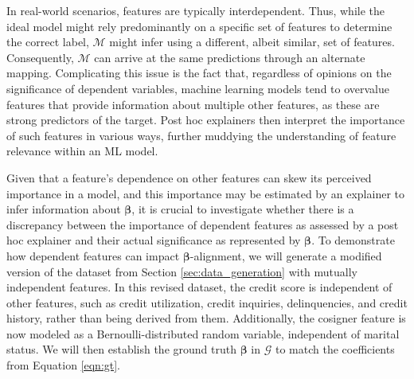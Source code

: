 \documentclass[mnsc,blindrev]{informs3}
\begin{document}
In real-world scenarios, features are typically interdependent. Thus, while the ideal model might rely predominantly on a specific set of features to determine the correct label, 
$\mathcal{M}$ might infer using a different, albeit similar, set of features. Consequently, 
$\mathcal{M}$ can arrive at the same predictions through an alternate mapping.
Complicating this issue is the fact that, regardless of opinions on the significance of dependent variables, machine learning models tend to overvalue features that provide information about multiple other features, as these are strong predictors of the target. Post hoc explainers then interpret the importance of such features in various ways, further muddying the understanding of feature relevance within an ML model.



Given that a feature's dependence on other features can skew its perceived importance in a model, and this importance may be estimated by an explainer to infer information about $\boldsymbol{\beta}$, it is crucial to investigate whether there is a discrepancy between the importance of dependent features as assessed by a post hoc explainer and their actual significance as represented by $\boldsymbol{\beta}$. To demonstrate how dependent features can impact $\boldsymbol{\beta}$-alignment, we will generate a modified version of the dataset from Section \ref{sec:data_generation} with mutually independent features. In this revised dataset, the credit score is independent of other features, such as credit utilization, credit inquiries, delinquencies, and credit history, rather than being derived from them. Additionally, the cosigner feature is now modeled as a Bernoulli-distributed random variable, independent of marital status. We will then establish the ground truth $\boldsymbol{\beta}$ in $\mathcal{G}$ to match the coefficients  from Equation \ref{eqn:gt}. %
\end{document}
